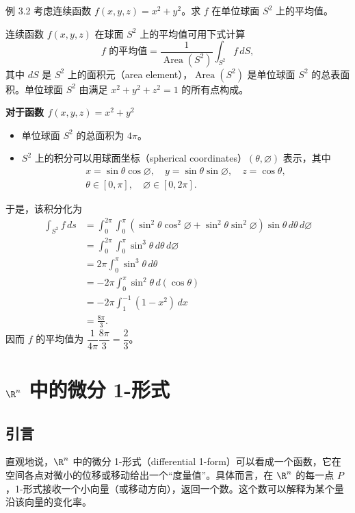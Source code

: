 \begin{statement}{例 3.2}{}
考虑连续函数 $f(x,y,z)=x^2+y^2$。求 $f$ 在单位球面 $S^2$ 上的平均值。

连续函数 $f(x,y,z)$ 在球面 $S^2$ 上的平均值可用下式计算
\[
  f\text{ 的平均值}
  =\frac{1}{\operatorname{Area}(S^2)}\int_{S^2} f\,dS,
\]
其中 $dS$ 是 $S^2$ 上的面积元（area element），$\operatorname{Area}(S^2)$ 是单位球面 $S^2$ 的总表面积。单位球面 $S^2$ 由满足 $x^2+y^2+z^2=1$ 的所有点构成。

\textbf{对于函数 $f(x,y,z)=x^2+y^2$}
\begin{itemize}
\item 单位球面 $S^2$ 的总面积为 $4\pi$。
\item $S^2$ 上的积分可以用球面坐标（spherical coordinates）$(\theta,\varnothing)$ 表示，其中
\[
\begin{gathered}
  x=\sin\theta\cos\varnothing,\quad
  y=\sin\theta\sin\varnothing,\quad z=\cos\theta,\\
  \theta\in[0,\pi],\quad \varnothing\in[0,2\pi].
\end{gathered}
\]
\end{itemize}
于是，该积分化为
\begin{align*}
 \int_{S^2} f\,ds
 &=\int_0^{2\pi}\!\!\int_0^\pi
   (\sin^2\theta\cos^2\varnothing+\sin^2\theta\sin^2\varnothing)
   \sin\theta\,d\theta\,d\varnothing\\
 &=\int_0^{2\pi}\!\!\int_0^\pi\sin^3\theta\,d\theta\,d\varnothing\\
 &=2\pi\int_0^\pi\sin^3\theta\,d\theta\\
 &=-2\pi\int_0^\pi\sin^2\theta\,d(\cos\theta)\\
 &=-2\pi\int_1^{-1}(1-x^2)\,dx\\
 &=\frac{8\pi}{3}.
\end{align*}
因而 $f$ 的平均值为 $\dfrac{1}{4\pi}\dfrac{8\pi}{3}=\dfrac{2}{3}$。
\end{statement}

\section{\texorpdfstring{$\R^n$}{Rⁿ} 中的微分 1-形式}
\label{sec:3.2}
\subsection{引言}

直观地说，$\R^n$ 中的微分 1-形式（differential 1-form）可以看成一个函数，它在空间各点对微小的位移或移动给出一个“度量值”。具体而言，在 $\R^n$ 的每一点 $P$，1-形式接收一个小向量（或移动方向），返回一个数。这个数可以解释为某个量沿该向量的变化率。


